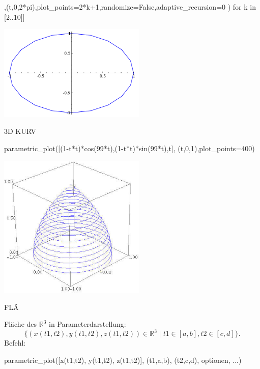 \documentclass[fontsize=12pt,paper=a4,twoside,bibtotoc,idxtotoc,
liststotoc,pagesize,BCOR1.2cm,DIV15,chapterprefix,pagesize=pdftex]{scrbook}
\theoremstyle{plain}
\theoremstyle{definition}
\theoremstyle{remark}
\begin{document}
\begin{sagein}
[parametric_plot([cos(t),sin(t)],(t,0,2*pi),plot_points=2*k+1,randomize=False,adaptive_recursion=0 ) for k in [2..10]]
\end{sagein}
\begin{center}
\includegraphics[width=7cm]{parametric2d_2.pdf} 
\end{center}

3D KURV

\begin{sagein}
parametric_plot([(1-t*t)*cos(99*t),(1-t*t)*sin(99*t),t], (t,0,1),plot_points=400)
\end{sagein}
\begin{center}
\includegraphics[width=7cm]{parametric3d.jpg} 
\end{center}

FLÄ

Fläche des $\mathbb{R}^3$ in Parameterdarstellung:
\[
 \{(x(t1,t2),y(t1,t2),z(t1,t2)) \in \mathbb{R}^3 \;|\; t1 \in [a,b], t2 \in [c,d] \}.
\]
Befehl: 
\begin{sagein}
parametric_plot([x(t1,t2), y(t1,t2), z(t1,t2)], (t1,a,b), (t2,c,d), optionen, ...)
\end{sagein}
\end{document}
